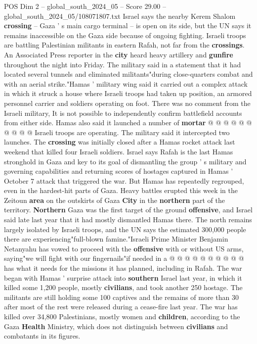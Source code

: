 \begin{textsample}{POS Dim 2 – global\_south\_2024\_05 – Score 29.00 – global\_south\_2024\_05/108071807.txt}
Israel says the nearby Kerem Shalom \textbf{crossing} -- Gaza ' s main cargo terminal -- is open on its side, but the UN says it remains inaccessible on the Gaza side because of ongoing fighting.
Israeli troops are battling Palestinian militants in eastern Rafah, not far from the \textbf{crossings}.
An Associated Press reporter in the \textbf{city} heard heavy artillery and \textbf{gunfire} throughout the night into Friday.
The military said in a statement that it had located several tunnels and eliminated militants"during close-quarters combat and with an aerial strike."Hamas ' military wing said it carried out a complex attack in which it struck a house where Israeli troops had taken up position, an armored personnel carrier and soldiers operating on foot.
There was no comment from the Israeli military, It is not possible to independently confirm battlefield accounts from either side.
Hamas also said it launched a number of \textbf{mortar} @ @ @ @ @ @ @ @ @ @ Israeli troops are operating.
The military said it intercepted two launches.
The \textbf{crossing} was initially closed after a Hamas rocket attack last weekend that killed four Israeli soldiers.
Israel says Rafah is the last Hamas stronghold in Gaza and key to its goal of dismantling the group ' s military and governing capabilities and returning scores of hostages captured in Hamas ' October 7 attack that triggered the war.
But Hamas has repeatedly regrouped, even in the hardest-hit parts of Gaza.
Heavy battles erupted this week in the Zeitoun \textbf{area} on the outskirts of Gaza \textbf{City} in the \textbf{northern} part of the territory. \textbf{Northern} Gaza was the first target of the ground \textbf{offensive}, and Israel said late last year that it had mostly dismantled Hamas there.
The north remains largely isolated by Israeli troops, and the UN says the estimated 300,000 people there are experiencing"full-blown famine."Israeli Prime Minister Benjamin Netanyahu has vowed to proceed with the \textbf{offensive} with or without US arms, saying"we will fight with our fingernails"if needed in a @ @ @ @ @ @ @ @ @ @ has what it needs for the missions it has planned, including in Rafah.
The war began with Hamas ' surprise attack into \textbf{southern} Israel last year, in which it killed some 1,200 people, mostly \textbf{civilians}, and took another 250 hostage.
The militants are still holding some 100 captives and the remains of more than 30 after most of the rest were released during a cease-fire last year.
The war has killed over 34,800 Palestinians, mostly women and \textbf{children}, according to the Gaza \textbf{Health} Ministry, which does not distinguish between \textbf{civilians} and combatants in its figures.

\end{textsample}
